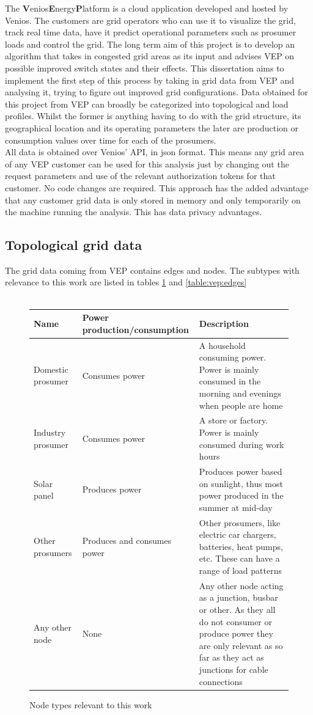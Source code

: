 The \textbf{V}enios\textbf{E}nergy\textbf{P}latform is a cloud application
developed and hosted by Venios. The customers are grid operators who can use
it to visualize the grid, track real time data, have it predict 
operational parameters such as prosumer loads and control the grid.
The long term aim of this project is to develop an algorithm that takes in
congested grid areas as its input and advises VEP on possible improved
switch states and their effects. This dissertation aims to implement the first step of this
process by taking in grid data from VEP and analysing it, trying to figure out
improved grid configurations. Data obtained for this project from VEP can broadly
be categorized
into topological and load profiles. Whilst the former is anything having to do with
the grid structure, its geographical location and its operating parameters the later
are production or consumption values over time for each of the prosumers.\\
All data is obtained over Venios' API, in json format. This means any
grid area of any VEP customer can be used for this analysis just by changing out
the request parameters and use of the relevant authorization tokens for that customer.
No code changes are required. This approach has the added advantage that any customer grid
data is only stored in memory and only temporarily on the machine running the analysis. This
has data privacy advantages.

\subsection{Topological grid data}

The grid data coming from VEP contains edges and nodes.
The subtypes with relevance to this work are listed in tables \ref{table:vep:nodes} and
\ref{table:vep:edges}\\
\\
\begin{figure}[H]
    \begin{tabular}{l p{3cm} p{8cm}}
        Name & Power production/consumption & Description\\
        \hline
        Domestic prosumer & Consumes power & A household consuming power. Power is mainly consumed in the morning and evenings when people are home\\
        Industry prosumer & Consumes power & A store or factory. Power is mainly consumed during work hours\\
        Solar panel       & Produces power & Produces power based on sunlight, thus most power produced in the summer at mid-day\\
        Other prosumers   & Produces and consumes power & Other prosumers, like electric car chargers, batteries, heat pumps, etc. These can have a range of load patterns\\
        Any other node    & None           & Any other node acting as a junction, busbar or other. As they all do not consumer or produce power they are only relevant as so far as they act as junctions for cable connections
    \end{tabular}
    \caption{Node types relevant to this work}
    \label{table:vep:nodes}
\end{figure}

